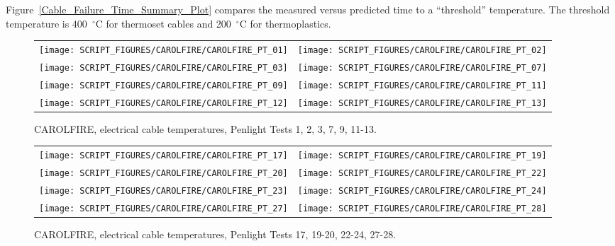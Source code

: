 Figure~\ref{Cable_Failure_Time_Summary_Plot} compares the measured versus predicted time to a ``threshold'' temperature. The threshold temperature is 400~$^\circ$C for thermoset cables and 200~$^\circ$C for thermoplastics.

\newpage

\begin{figure}[p]
\begin{tabular*}{\textwidth}{l@{\extracolsep{\fill}}r}
\texttt{[image: SCRIPT\_FIGURES/CAROLFIRE/CAROLFIRE\_PT\_01]} &
\texttt{[image: SCRIPT\_FIGURES/CAROLFIRE/CAROLFIRE\_PT\_02]} \\
\texttt{[image: SCRIPT\_FIGURES/CAROLFIRE/CAROLFIRE\_PT\_03]} &
\texttt{[image: SCRIPT\_FIGURES/CAROLFIRE/CAROLFIRE\_PT\_07]} \\
\texttt{[image: SCRIPT\_FIGURES/CAROLFIRE/CAROLFIRE\_PT\_09]} &
\texttt{[image: SCRIPT\_FIGURES/CAROLFIRE/CAROLFIRE\_PT\_11]} \\
\texttt{[image: SCRIPT\_FIGURES/CAROLFIRE/CAROLFIRE\_PT\_12]} &
\texttt{[image: SCRIPT\_FIGURES/CAROLFIRE/CAROLFIRE\_PT\_13]}
\end{tabular*}
\caption{CAROLFIRE, electrical cable temperatures, Penlight Tests 1, 2, 3, 7, 9, 11-13.}
\label{CAROLFIRE_Thermoset_1}
\end{figure}

\begin{figure}[p]
\begin{tabular*}{\textwidth}{l@{\extracolsep{\fill}}r}
\texttt{[image: SCRIPT\_FIGURES/CAROLFIRE/CAROLFIRE\_PT\_17]} &
\texttt{[image: SCRIPT\_FIGURES/CAROLFIRE/CAROLFIRE\_PT\_19]} \\
\texttt{[image: SCRIPT\_FIGURES/CAROLFIRE/CAROLFIRE\_PT\_20]} &
\texttt{[image: SCRIPT\_FIGURES/CAROLFIRE/CAROLFIRE\_PT\_22]} \\
\texttt{[image: SCRIPT\_FIGURES/CAROLFIRE/CAROLFIRE\_PT\_23]} &
\texttt{[image: SCRIPT\_FIGURES/CAROLFIRE/CAROLFIRE\_PT\_24]} \\
\texttt{[image: SCRIPT\_FIGURES/CAROLFIRE/CAROLFIRE\_PT\_27]} &
\texttt{[image: SCRIPT\_FIGURES/CAROLFIRE/CAROLFIRE\_PT\_28]}
\end{tabular*}
\caption{CAROLFIRE, electrical cable temperatures, Penlight Tests 17, 19-20, 22-24, 27-28.}
\label{CAROLFIRE_Thermoset_2}
\end{figure}

